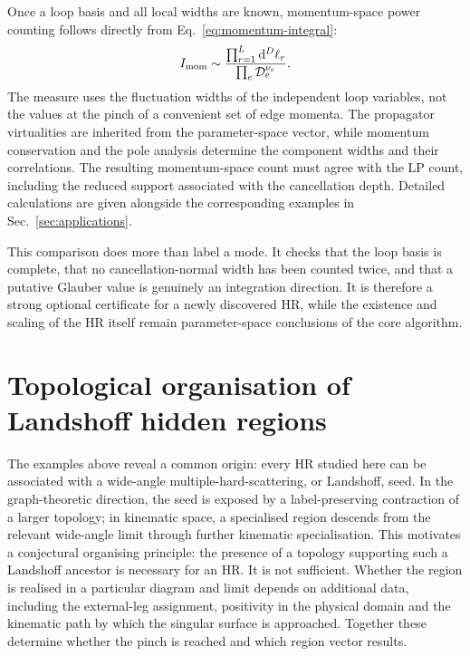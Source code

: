 \documentclass[a4paper,11pt]{article}
\newcommand{\dd}{\mathrm d}
\begin{document}
Once a loop basis and all local widths are known, momentum-space power
counting follows directly from Eq.~\eqref{eq:momentum-integral}:
\begin{equation}
 I_{\rm mom}\sim
 \frac{\prod_{r=1}^{L}\dd^D\ell_r}
      {\prod_e \mathcal D_e^{\nu_e}}.
 \label{eq:momentum-power-general}
\end{equation}
The measure uses the fluctuation widths of the independent loop variables,
not the values at the pinch of a convenient set of edge momenta.  The
propagator virtualities are inherited from the parameter-space vector, while
momentum conservation and the pole analysis determine the component widths
and their correlations.  The resulting momentum-space count must agree with
the LP count, including the reduced support associated with the cancellation
depth.  Detailed calculations are given alongside the corresponding examples
in Sec.~\ref{sec:applications}.

This comparison does more than label a mode.  It checks that the loop basis
is complete, that no cancellation-normal width has been counted twice, and
that a putative Glauber value is genuinely an integration direction.  It is
therefore a strong optional certificate for a newly discovered HR, while the
existence and scaling of the HR itself remain parameter-space conclusions of
the core algorithm.

\section{Topological organisation of Landshoff hidden regions}
\label{sec:topological-organization}

The examples above reveal a common origin: every HR studied here can be
associated with a wide-angle multiple-hard-scattering, or Landshoff, seed.  In
the graph-theoretic direction, the seed is exposed by a label-preserving
contraction of a larger topology; in kinematic space, a specialised region descends from the
relevant wide-angle limit through further kinematic specialisation.
This motivates a conjectural organising principle: the presence of a topology
supporting such a Landshoff ancestor is necessary for an HR.  It is not
sufficient.  Whether the region is realised in a particular diagram and limit
depends on additional data, including the external-leg assignment, positivity
in the physical domain and the kinematic path by which the singular surface is
approached.  Together these determine whether the pinch is reached and which
region vector results.
\end{document}
